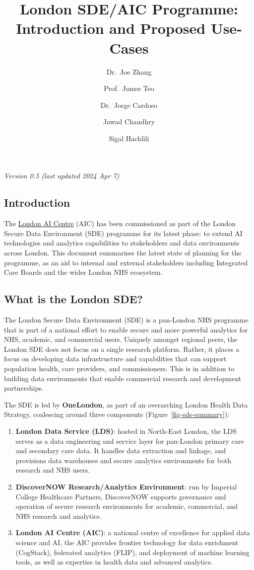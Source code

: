 \documentclass[
  letterpaper,
  DIV=11,
  numbers=noendperiod]{scrartcl}
\title{London SDE/AIC Programme: Introduction and Proposed Use-Cases}
\author{Dr.~Joe Zhang \and Prof.~James Teo \and Dr.~Jorge
Cardoso \and Jawad Chaudhry \and Sigal Hachlili}
\date{}
\begin{document}
\maketitle

\emph{Version 0.5 (last updated 2024 Apr 7)}

\subsection{Introduction}\label{introduction}

The \href{https://www.aicentre.co.uk/}{London AI Centre} (AIC) has been
commissioned as part of the London Secure Data Environment (SDE)
programme for its latest phase: to extend AI technologies and analytics
capabilities to stakeholders and data environments across London. This
document summarises the latest state of planning for the programme, as
an aid to internal and external stakeholders including Integrated Care
Boards and the wider London NHS ecosystem.

\subsection{What is the London SDE?}\label{what-is-the-london-sde}

The London Secure Data Environment (SDE) is a pan-London NHS programme
that is part of a national effort to enable secure and more powerful
analytics for NHS, academic, and commercial users. Uniquely amongst
regional peers, the London SDE does not focus on a single research
platform. Rather, it places a focus on developing data infrastructure
and capabilities that can support population health, care providers, and
commissioners. This is in addition to building data environments that
enable commercial research and development partnerships.

The SDE is led by \textbf{OneLondon}, as part of an overarching London
Health Data Strategy, coalescing around three components
(Figure~\ref{fig-sde-summary}):

\begin{enumerate}
\def\labelenumi{(\arabic{enumi})}
\item
  \textbf{London Data Service (LDS)}: hosted in North-East London, the
  LDS serves as a data engineering and service layer for pan-London
  primary care and secondary care data. It handles data extraction and
  linkage, and provisions data warehouses and secure analytics
  environments for both research and NHS users.
\item
  \textbf{DiscoverNOW Research/Analytics Environment}: run by Imperial
  College Healthcare Partners, DiscoverNOW supports governance and
  operation of secure research environments for academic, commercial,
  and NHS research and analytics.
\item
  \textbf{London AI Centre (AIC)}: a national centre of excellence for
  applied data science and AI, the AIC provides frontier technology for
  data enrichment (CogStack), federated analytics (FLIP), and deployment
  of machine learning tools, as well as expertise in health data and
  advanced analytics.
\end{enumerate}
\end{document}
